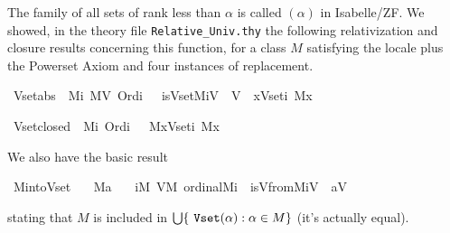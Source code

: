 The
family of all sets of rank less than $\alpha$ is called
$(\alpha)$ in Isabelle/ZF. We showed, in the theory file
\verb|Relative_Univ.thy|
 the following
relativization and closure results concerning this function, for a
class $M$ satisfying the locale 
plus the Powerset Axiom and four instances of replacement.
%
\begin{isabelle}
\isamarkupfalse%
\ Vset{\isacharunderscore}abs{\isacharcolon}\ {\isachardoublequoteopen}{\isasymlbrakk}\ M{\isacharparenleft}i{\isacharparenright}{\isacharsemicolon}\ M{\isacharparenleft}V{\isacharparenright}{\isacharsemicolon}\ Ord{\isacharparenleft}i{\isacharparenright}\ {\isasymrbrakk}\ {\isasymLongrightarrow}\ is{\isacharunderscore}Vset{\isacharparenleft}M{\isacharcomma}i{\isacharcomma}V{\isacharparenright}\ {\isasymlongleftrightarrow}\ V\ {\isacharequal}\ {\isacharbraceleft}x{\isasymin}Vset{\isacharparenleft}i{\isacharparenright}{\isachardot}\ M{\isacharparenleft}x{\isacharparenright}{\isacharbraceright}{\isachardoublequoteclose}
\end{isabelle}
\begin{isabelle}
\isamarkupfalse%
\ Vset{\isacharunderscore}closed{\isacharcolon}\ {\isachardoublequoteopen}{\isasymlbrakk}\ M{\isacharparenleft}i{\isacharparenright}{\isacharsemicolon}\ Ord{\isacharparenleft}i{\isacharparenright}\ {\isasymrbrakk}\ {\isasymLongrightarrow}\ M{\isacharparenleft}{\isacharbraceleft}x{\isasymin}Vset{\isacharparenleft}i{\isacharparenright}{\isachardot}\ M{\isacharparenleft}x{\isacharparenright}{\isacharbraceright}{\isacharparenright}{\isachardoublequoteclose}
\end{isabelle}
We also have the basic result
\begin{isabelle}
\isamarkupfalse%
\ M{\isacharunderscore}into{\isacharunderscore}Vset{\isacharcolon}\isanewline
\ \ \ {\isachardoublequoteopen}M{\isacharparenleft}a{\isacharparenright}{\isachardoublequoteclose}\isanewline
\ \ \ {\isachardoublequoteopen}{\isasymexists}i{\isacharbrackleft}M{\isacharbrackright}{\isachardot}\ {\isasymexists}V{\isacharbrackleft}M{\isacharbrackright}{\isachardot}\ ordinal{\isacharparenleft}M{\isacharcomma}i{\isacharparenright}\ {\isasymand}\ is{\isacharunderscore}Vfrom{\isacharparenleft}M{\isacharcomma}{}{\isacharcomma}i{\isacharcomma}V{\isacharparenright}\ {\isasymand}\ a{\isasymin}V{\isachardoublequoteclose}
\end{isabelle}
stating that $M$ is included in 
$\union\{\isatt{Vset}(\alpha) : \alpha\in M\}$ (it's actually equal).

